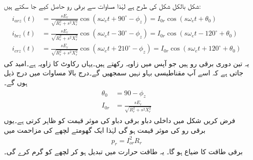 شکل  بالکل شکل   کی طرح ہے لہٰذا مساوات   سے برقی رو حاصل کیے جا سکتے ہیں:
\begin{gather}
\begin{aligned}
i_{arz}(t)&=\frac{s E_r}{\sqrt{R_r^2+s^2 X_r^2}} \cos \left(s \omega_e t +90^{\circ}-\phi_z \right)=I_{0r} \cos (s \omega_e t +\theta_0)\\
i_{brz}(t)&=\frac{s E_r}{\sqrt{R_r^2+s^2 X_r^2}} \cos \left(s \omega_e t -30^{\circ}-\phi_z \right)=I_{0r} \cos (s \omega_e t -120 ^{\circ}+\theta_0)\\
i_{crz}(t)&=\frac{s E_r}{\sqrt{R_r^2+s^2 X_r^2}} \cos \left(s \omega_e t +210^{\circ}-\phi_z \right)=I_{0r} \cos (s \omega_e t+120^{\circ} +\theta_0)
\end{aligned}
\end{gather}
یہ تین دوری برقی رو ہیں جو آپس میں   زاویہ رکھتے ہیں۔یہاں  رکاوٹ کا زاویہ ہے۔امید کی جاتی ہے کہ اسے آپ مقناطیسی بہاو نہیں سمجھیں گے۔درج بالا مساوات میں درج ذیل ہوں گے۔
\begin{gather}
\begin{aligned}\label{مساوات_امالی_گھومتا_رو}
\theta_0&=90-\phi_z \\
I_{0r}&=\frac{s E_r}{\sqrt{R_r^2+s^2 X_r^2}}
\end{aligned}
\end{gather}
فرض کریں شکل  میں داخلی دباو  برقی دباو کی موثر قیمت کو ظاہر کرتی ہے۔یوں  برقی رو کی موثر قیمت ہو گی لہٰذا ایک گھومتے لچھے کی مزاحمت میں 
\begin{align}\label{مساوات_امالی_طاقت_ضیاع_گھمتا_حصہ}
p_r =I_{or}^2 R_r
\end{align}
برقی طاقت کا ضیاع ہو گا۔  یہ طاقت حرارت میں تبدیل ہو کر  لچھے کو گرم کرے گی۔

